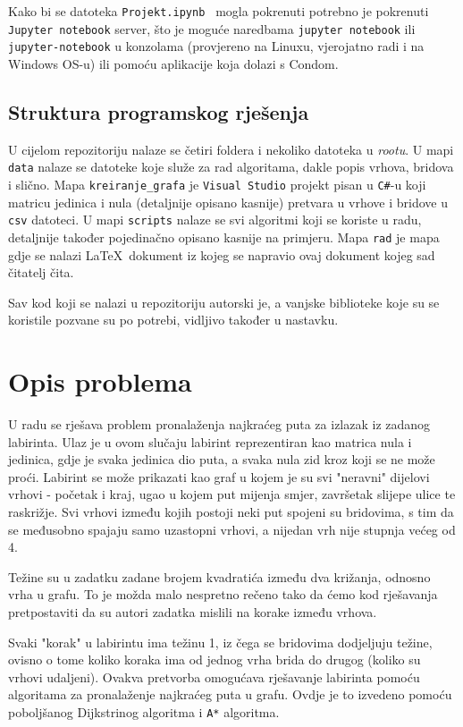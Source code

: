 \documentclass[11pt]{article}
\let\Oldlatex\LaTeX
\renewcommand{\LaTeX}{\textrm{\Oldlatex}}
\let\oldsection\section
\renewcommand\section{\clearpage\oldsection}
\begin{document}
Kako bi se datoteka \texttt{Projekt.ipynb } mogla pokrenuti potrebno je
pokrenuti \texttt{Jupyter notebook} server, što je moguće naredbama
\texttt{jupyter notebook} ili \texttt{jupyter-notebook} u konzolama (provjereno
na Linuxu, vjerojatno radi i na Windows OS-u) ili pomoću aplikacije koja dolazi
s Condom.

\subsection{Struktura programskog rješenja}

U cijelom repozitoriju nalaze se četiri foldera i nekoliko datoteka u
\textit{rootu}. U mapi \texttt{data} nalaze se datoteke koje služe za rad
algoritama, dakle popis vrhova, bridova i slično.
Mapa \texttt{kreiranje\_grafa} je \texttt{Visual Studio} projekt pisan u
\texttt{C\#}-u koji matricu jedinica i nula (detaljnije opisano kasnije)
pretvara u vrhove i bridove u \texttt{csv} datoteci.
U mapi \texttt{scripts} nalaze se svi algoritmi koji se koriste u radu,
detaljnije također pojedinačno opisano kasnije na primjeru.
Mapa \texttt{rad} je mapa gdje se nalazi \LaTeX\ dokument iz kojeg se
napravio ovaj dokument kojeg sad čitatelj čita.

Sav kod koji se nalazi u repozitoriju autorski je, a vanjske biblioteke koje su
se koristile pozvane su po potrebi, vidljivo također u nastavku.

	\section{Opis problema}
	U radu se rješava problem pronalaženja najkraćeg puta za izlazak iz
	zadanog labirinta. Ulaz je u ovom slučaju labirint reprezentiran kao
	matrica nula i jedinica, gdje je svaka jedinica dio puta, a svaka nula
	zid kroz koji se ne može proći. Labirint se može prikazati kao graf u
	kojem je su svi "neravni" dijelovi vrhovi - početak i kraj, ugao u
	kojem put mijenja smjer, završetak slijepe ulice te raskrižje. Svi
	vrhovi između kojih postoji neki put spojeni su bridovima, s tim da se
	međusobno spajaju samo uzastopni vrhovi, a nijedan vrh nije stupnja
	većeg od 4.

	Težine su u zadatku zadane brojem kvadratića između dva križanja,
	odnosno vrha u grafu. To je možda malo nespretno rečeno tako da ćemo
	kod rješavanja pretpostaviti da su autori zadatka mislili na korake
	između vrhova.

	Svaki "korak" u labirintu ima težinu 1, iz čega se bridovima dodjeljuju
	težine, ovisno o tome koliko koraka ima od jednog vrha brida do drugog
	(koliko su vrhovi udaljeni). Ovakva pretvorba omogućava rješavanje
	labirinta pomoću algoritama za pronalaženje najkraćeg puta u grafu.
	Ovdje je to izvedeno pomoću poboljšanog Dijkstrinog algoritma i
	\texttt{A*} algoritma.
\end{document}
